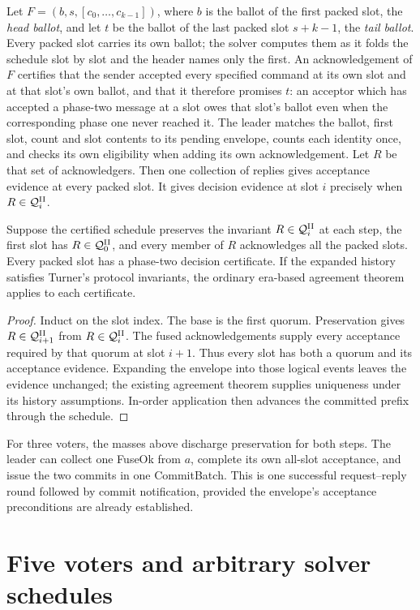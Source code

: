 Let $F=(b,s,[c_0,\ldots,c_{k-1}])$, where $b$ is the ballot of the first
packed slot, the \emph{head ballot}, and let $t$ be the ballot of the last
packed slot $s+k-1$, the \emph{tail ballot}. Every packed slot carries its own
ballot; the solver computes them as it folds the schedule slot by slot and the
header names only the first. An acknowledgement of $F$ certifies that
the sender accepted every specified command at its own slot and at that slot's
own ballot, and that it therefore promises $t$: an acceptor which has accepted
a phase-two message at a slot owes that slot's ballot even when the
corresponding phase one never reached it. The leader matches the ballot, first
slot, count and slot contents to its
pending envelope, counts each identity once, and checks its own eligibility
when adding its own acknowledgement. Let $R$ be that set of acknowledgers.
Then one collection of replies gives acceptance evidence at every packed slot.
It gives decision evidence at slot $i$ precisely when $R\in\mathcal{Q}^{\mathrm {II}}_i$.

\begin{theorem}\label{thm:fuse}
Suppose the certified schedule preserves the invariant $R\in\mathcal{Q}^{\mathrm {II}}_i$ at each
step, the first slot has $R\in\mathcal{Q}^{\mathrm {II}}_0$, and every member of $R$ acknowledges
all the packed slots. Every packed slot has a phase-two decision certificate.
If the expanded history satisfies Turner's protocol invariants, the ordinary
era-based agreement theorem applies to each certificate.
\end{theorem}
\begin{proof}
Induct on the slot index. The base is the first quorum. Preservation gives
$R\in\mathcal{Q}^{\mathrm {II}}_{i+1}$ from $R\in\mathcal{Q}^{\mathrm {II}}_i$. The fused acknowledgements supply every
acceptance required by that quorum at slot $i+1$. Thus every slot has both a
quorum and its acceptance evidence. Expanding the envelope into those logical
events leaves the evidence unchanged; the existing agreement theorem supplies
uniqueness under its history assumptions. In-order application then advances
the committed prefix through the schedule.
\end{proof}
For three voters, the masses above discharge preservation for both steps.
The leader can collect one FuseOk from $a$, complete its own all-slot
acceptance, and issue the two commits in one CommitBatch. This is one successful
request--reply round followed by commit notification, provided the envelope's
acceptance preconditions are already established.

\section{Five voters and arbitrary solver schedules}\label{sec:fuse-five}
